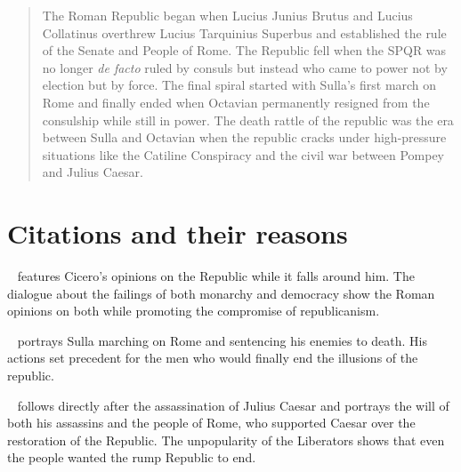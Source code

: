\documentclass[12pt]{article}
\begin{document}
    \begin{abstract}
        The Roman Republic began when Lucius Junius Brutus and Lucius Collatinus overthrew Lucius Tarquinius Superbus and established the rule of the Senate and People of Rome. The Republic fell when the SPQR was no longer \emph{de facto} ruled by consuls but instead who came to power not by election but by force. The final spiral started with Sulla's first march on Rome and finally ended when Octavian permanently resigned from the consulship while still in power. The death rattle of the republic was the era between Sulla and Octavian when the republic cracks under high-pressure situations like the Catiline Conspiracy and the civil war between Pompey and Julius Caesar.
    \end{abstract}
    \section*{Citations and their reasons}
~\cite{DeRePublica} features Cicero's opinions on the Republic while it falls around him. The dialogue about the failings of both monarchy and democracy show the Roman opinions on both while promoting the compromise of republicanism.

~\cite{PlutarchSulla} portrays Sulla marching on Rome and sentencing his enemies to death. His actions set precedent for the men who would finally end the illusions of the republic.

~\cite{RomanRevolution} follows directly after the assassination of Julius Caesar and portrays the will of both his assassins and the people of Rome, who supported Caesar over the restoration of the Republic. The unpopularity of the Liberators shows that even the people wanted the rump Republic to end.

    
    
\end{document}
